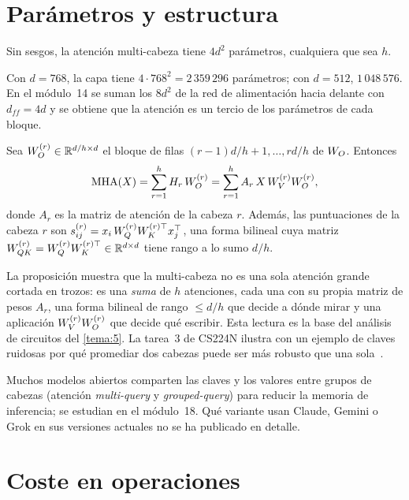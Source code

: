 \section{Parámetros y estructura}

\begin{proposicion}[Parámetros]\label{prop:param}
Sin sesgos, la atención multi-cabeza tiene $4d^{2}$ parámetros, cualquiera que sea $h$.
\end{proposicion}

Con $d=768$, la capa tiene $4\cdot 768^{2}=2\,359\,296$ parámetros; con $d=512$, $1\,048\,576$. En el módulo~14 se suman los $8d^{2}$ de la red de alimentación hacia delante con $d_{ff}=4d$ y se obtiene que la atención es un tercio de los parámetros de cada bloque.

\begin{proposicion}\label{prop:descomp}
Sea $W_{O}^{(r)}\in\mathbb{R}^{d/h\times d}$ el bloque de filas $(r-1)d/h+1,\dots,rd/h$ de $W_{O}$. Entonces
\[
\operatorname{MHA}(X)=\sum_{r=1}^{h}H_r\,W_{O}^{(r)}=\sum_{r=1}^{h}A_r\,X\,W_{V}^{(r)}W_{O}^{(r)},
\]
donde $A_r$ es la matriz de atención de la cabeza $r$. Además, las puntuaciones de la cabeza $r$ son $s^{(r)}_{ij}=x_i\,W_{Q}^{(r)}W_{K}^{(r)\top}x_j^{\top}$, una forma bilineal cuya matriz $W_{QK}^{(r)}=W_{Q}^{(r)}W_{K}^{(r)\top}\in\mathbb{R}^{d\times d}$ tiene rango a lo sumo $d/h$.
\end{proposicion}

La proposición muestra que la multi-cabeza no es una sola atención grande cortada en trozos: es una \emph{suma} de $h$ atenciones, cada una con su propia matriz de pesos $A_r$, una forma bilineal de rango $\le d/h$ que decide a dónde mirar y una aplicación $W_{V}^{(r)}W_{O}^{(r)}$ que decide qué escribir. Esta lectura es la base del análisis de circuitos del \cref{tema:5}. La tarea~3 de CS224N ilustra con un ejemplo de claves ruidosas por qué promediar dos cabezas puede ser más robusto que una sola~\cite[tarea~3, pregunta~1]{cs224n}.

\begin{observacion}[Variantes]
Muchos modelos abiertos comparten las claves y los valores entre grupos de cabezas (atención \emph{multi-query} y \emph{grouped-query}) para reducir la memoria de inferencia; se estudian en el módulo~18. Qué variante usan Claude, Gemini o Grok en sus versiones actuales no se ha publicado en detalle.
\end{observacion}

\section{Coste en operaciones}

